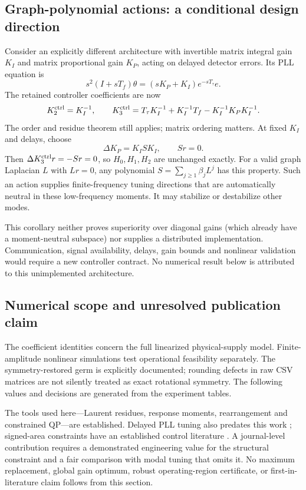 \documentclass[11pt]{article}
\begin{document}
\subsection{Graph-polynomial actions: a conditional design direction}
Consider an explicitly different architecture with invertible matrix integral
gain $K_I$ and matrix proportional gain $K_P$, acting on delayed detector
errors. Its PLL equation is
\[
 s^2(I+sT_f)\theta=(sK_P+K_I)e^{-sT_\tau}e.
\]
The retained controller coefficients are now
\[
 K_2^{\rm ctrl}=K_I^{-1},\qquad
 K_3^{\rm ctrl}=T_\tau K_I^{-1}+K_I^{-1}T_f
                         -K_I^{-1}K_PK_I^{-1}.
\]
The order and residue theorem still applies; matrix ordering matters.
At fixed $K_I$ and delays, choose
\begin{equation}
 \Delta K_P=K_I S K_I,\qquad Sr=0.
 \label{eq:graphneutral}
\end{equation}
Then $\Delta K_3^{\rm ctrl}r=-Sr=0$, so $H_0,H_1,H_2$ are unchanged exactly.
For a valid graph Laplacian $L$ with $Lr=0$, any polynomial
$S=\sum_{j\ge1}\beta_jL^j$ has this property. Such an action supplies
finite-frequency tuning directions that are automatically neutral in these
low-frequency moments. It may stabilize or destabilize other modes.

This corollary neither proves superiority over diagonal gains (which already
have a moment-neutral subspace) nor supplies a distributed implementation.
Communication, signal availability, delays, gain bounds and nonlinear
validation would require a new controller contract. No numerical result below
is attributed to this unimplemented architecture.

\subsection{Numerical scope and unresolved publication claim}
The coefficient identities concern the full linearized physical-supply model.
Finite-amplitude nonlinear simulations test operational feasibility separately.
The symmetry-restored germ is explicitly documented; rounding defects in raw
CSV matrices are not silently treated as exact rotational symmetry. The
following values and decisions are generated from the experiment tables.

The tools used here---Laurent residues, response moments, rearrangement and
constrained QP---are established. Delayed PLL tuning also predates this work
\cite{wilson}; signed-area constraints have an established control literature
\cite{aalipourmoments}. A journal-level contribution requires a demonstrated
engineering value for the structural constraint and a fair comparison with
modal tuning that omits it. No maximum replacement, global gain optimum,
robust operating-region certificate, or first-in-literature claim follows
from this section.
\end{document}
